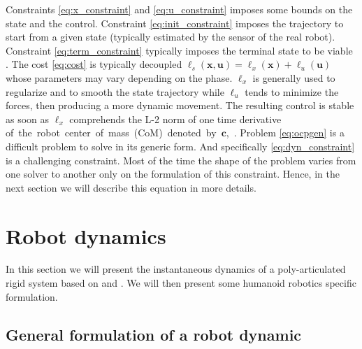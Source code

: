 Constraints \eqref{eq:x_constraint} and \eqref{eq:u_constraint} imposes some bounds on the state and the control.
Constraint \eqref{eq:init_constraint} imposes the trajectory to start from a given state (typically estimated by the sensor of the real robot).
Constraint \eqref{eq:term_constraint} typically imposes the terminal state to be viable \cite{wieber_humanoid08}.
The cost \eqref{eq:cost} is typically decoupled $\ell_s(\bm x,\bm u) = \ell_x(\bm x) + \ell_u(\bm u)$ whose parameters may vary depending on the phase. $\ell_x$ is generally used to regularize and to smooth the state trajectory while $\ell_u$ tends to minimize the forces, then producing a more dynamic movement. The resulting control is stable as soon as $\ell_x$ comprehends the L-2 norm of one time derivative \mbox{of the robot center of mass (CoM) denoted by $\bm c$, \cite{wieber_handbook15}}.
Problem \eqref{eq:ocpgen} is a difficult problem to solve in its generic form.
And specifically \eqref{eq:dyn_constraint} is a challenging constraint.
Most of the time the shape of the problem varies from one solver to another only on the formulation of this constraint.
Hence, in the next section we will describe this equation in more details.

\section*{Robot dynamics}
\label{section:dynamics}

In this section we will present the instantaneous dynamics of a poly-articulated rigid system based on \cite{Orin:autorob:2013} and \cite{Kajita2003b}.
We will then present some humanoid robotics specific formulation.

\subsection*{General formulation of a robot dynamic}

